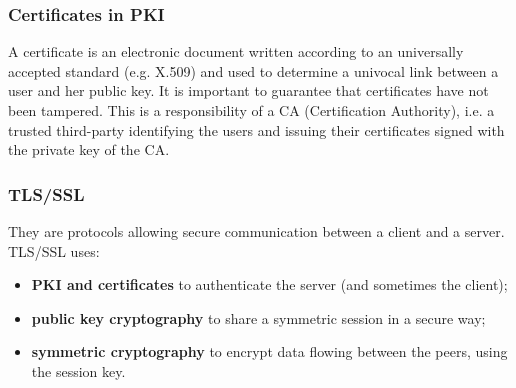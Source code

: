 \documentclass[a4paper, 10pt, titlepage]{article}
\begin{document}
\subsubsection*{Certificates in PKI}
A certificate is an electronic document written according to an universally accepted standard (e.g. X.509) and used to determine a univocal link between a user and her public key. It is important to guarantee that certificates have not been tampered. This is a responsibility of a CA (Certification Authority), i.e. a trusted third-party identifying the users and issuing their certificates signed with the private key of the CA.

\subsubsection{TLS/SSL}
They are protocols allowing secure communication between a client and a server. TLS/SSL uses:
\begin{itemize}
\item \textbf{PKI and certificates} to authenticate the server (and sometimes the client);
\item \textbf{public key cryptography} to share a symmetric session in a secure way;
\item \textbf{symmetric cryptography} to encrypt data flowing between the peers, using the session key.
\end{itemize}
\end{document}
